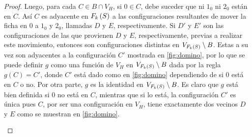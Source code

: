 \begin{proof}
    Luego, para cada $C \in B \cap V_H$, si $0 \in C$, debe suceder que ni $1_0$
    ni $2_0$ est\'an en $C$. As\'i $C$ es adyacente en $F_{k}\left( S\right)$ a las
    configuraciones resultantes de mover la ficha en $0$ a $1_0$ y $2_0$,
    llamadas $D$ y $E$, respectivamente. Si $D'$ y $E'$ son las configuraciones
    de las que provienen $D$ y $E$, respectivamente, previas a realizar este
    movimiento, entonces son configuraciones distintas en $V_{F_{k}\left( S\right)}\setminus
    B$. Estas a su vez son adyacentes a la configuraci\'on $C'$ mostrada en
    \cref{fig:domino}, por lo que se puede definir $g$ como una funci\'on de
    $V_H$ en $V_{F_{k}\left( S\right)}\setminus B$ dada por la regla $g(C)=C'$, donde $C'$
    est\'a dado como en \cref{fig:domino} dependiendo de si $0$ est\'a en $C$ o
    no. Por otra parte, $g$ es la identidad en $V_{F_{k}\left( S\right)}\setminus B$. Es
    claro que $g$ est\'a bien definida si $0$ no est\'a en $C$, mientras que si
    lo est\'a, la configuraci\'on $C'$ es \'unica pues $C$, por ser una
    configuraci\'on en $V_H$, tiene exactamente dos vecinos $D$ y $E$ como se
    muestran en \cref{fig:domino}. 

    \begin{figure}[!htbp]
        \centering
\end{figure}
\end{proof}

